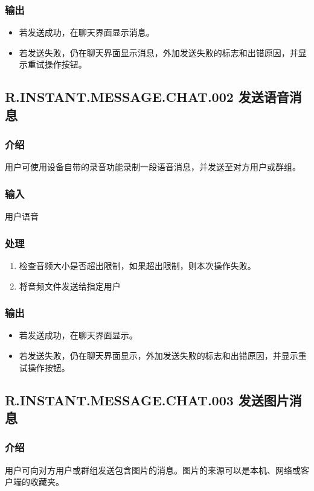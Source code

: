 \subsubsection{输出}
\begin{itemize}
	\item 若发送成功，在聊天界面显示消息。
	\item 若发送失败，仍在聊天界面显示消息，外加发送失败的标志和出错原因，并显示重试操作按钮。
	\end{itemize}
	

\subsection{R.INSTANT.MESSAGE.CHAT.002 发送语音消息}
\subsubsection{介绍}
用户可使用设备自带的录音功能录制一段语音消息，并发送至对方用户或群组。
\subsubsection{输入}
用户语音
\subsubsection{处理}
\begin{enumerate}
	\item 检查音频大小是否超出限制，如果超出限制，则本次操作失败。
	\item 将音频文件发送给指定用户
	\end{enumerate}
\subsubsection{输出}
\begin{itemize}
	\item 若发送成功，在聊天界面显示。
	\item 若发送失败，仍在聊天界面显示，外加发送失败的标志和出错原因，并显示重试操作按钮。
	\end{itemize}

	
\subsection{R.INSTANT.MESSAGE.CHAT.003 发送图片消息}
\subsubsection{介绍}
用户可向对方用户或群组发送包含图片的消息。图片的来源可以是本机、网络或客户端的收藏夹。

